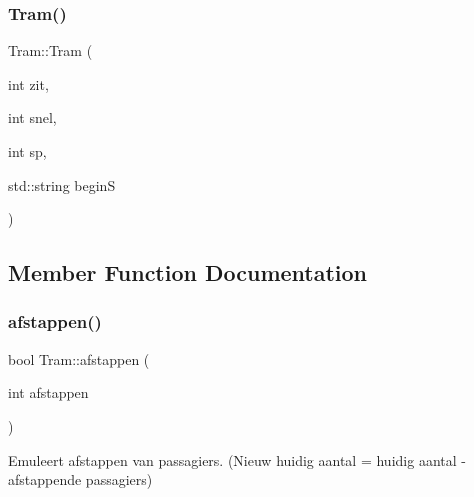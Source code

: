 \mbox{\label{class_tram_afef6559a85225dc0b8a9445d6d16cbbb}} 
\subsubsection{\texorpdfstring{Tram()}{Tram()}\hspace{0.1cm}{\footnotesize\ttfamily [2/2]}}
{\footnotesize\ttfamily Tram\+::\+Tram (\begin{DoxyParamCaption}\item[{int}]{zit,  }\item[{int}]{snel,  }\item[{int}]{sp,  }\item[{std\+::string}]{beginS }\end{DoxyParamCaption})}



\subsection{Member Function Documentation}
\mbox{\label{class_tram_a81186910caa5212b4a87eec84cd10a46}} 
\subsubsection{\texorpdfstring{afstappen()}{afstappen()}}
{\footnotesize\ttfamily bool Tram\+::afstappen (\begin{DoxyParamCaption}\item[{int}]{afstappen }\end{DoxyParamCaption})}



Emuleert afstappen van passagiers. (Nieuw huidig aantal = huidig aantal -\/ afstappende passagiers) 


